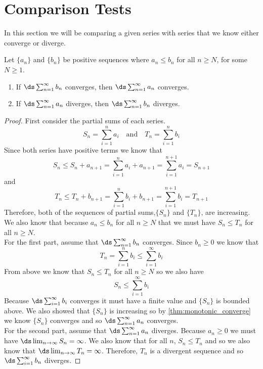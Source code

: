 \section{Comparison Tests}\label{sec:comp_tests}

In this section we will be comparing a given series with series that we know either converge or diverge.

{Let $\{a_n\}$ and $\{b_n\}$ be positive sequences where $a_n\leq b_n$ for all $n\geq N$,
for some $N\geq 1$. 
\begin{enumerate}
	\item If $\ds \sum_{n=1}^\infty b_n$ converges, then $\ds \sum_{n=1}^\infty a_n$ converges.
	\item	If $\ds \sum_{n=1}^\infty a_n$ diverges, then $\ds \sum_{n=1}^\infty b_n$ diverges.
\end{enumerate}}


\begin{proof}
First consider the partial sums of each series.
\[S_n=\sum_{i=1}^n a_i \quad \text{and} \quad T_n=\sum_{i=1}^n b_i\]
Since both series have positive terms we know that
\[S_n\leq S_n+a_{n+1}=\sum_{i=1}^n a_i+a_{n+1}=\sum_{i=1}^{n+1} a_i=S_{n+1}\]
and
\[T_n\leq T_n+b_{n+1}=\sum_{i=1}^n b_i+b_{n+1}=\sum_{i=1}^{n+1} b_i=T_{n+1}\]
Therefore, both of the sequences of partial sums,$\{S_n\}$ and $\{T_n\}$, are increasing. We also know that because $a_n\leq b_n$ for all $n\geq N$ that we must have $S_n\leq T_n$ for all $n\geq N$. \\
For the first part, assume that $\ds \sum_{n=1}^\infty b_n$ converges. Since $b_n\geq 0$ we know that 
\[T_n=\sum_{i=1}^n b_i\leq \sum_{i=1}^\infty b_i\]
From above we know that $S_n\leq T_n$ for all $n\geq N$ so we also have
\[S_n\leq \sum_{i=1}^\infty b_i\]
Because $\ds \sum_{i=1}^\infty b_i$ converges it must have a finite value and $\{S_n\}$ is bounded above. We also showed that $\{S_n\}$ is increasing so by \autoref{thm:monotonic_converge} we know $\{S_n\}$ converges and so $\ds \sum_{n=1}^\infty a_n$ converges.   \\
For the second part, assume that $\ds \sum_{n=1}^\infty a_n$ diverges. Because $a_n\geq 0$ we must have $\ds \lim_{n\to \infty} S_n=\infty$. We also know that for all $n$, $S_n\leq T_n$ and so we also know that $\ds \lim_{n\to \infty} T_n=\infty$. Therefore, ${T_n}$ is a divergent sequence and so $\ds \sum_{i=1}^\infty b_n$ diverges.
\end{proof}

